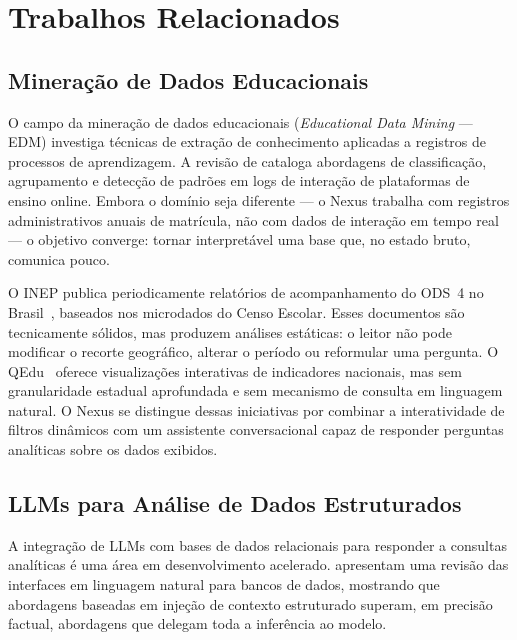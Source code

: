 \documentclass[preprint,10pt,5p]{elsarticle}
\begin{document}
\section{Trabalhos Relacionados}
\label{works}

\subsection{Mineração de Dados Educacionais}

O campo da mineração de dados educacionais (\textit{Educational Data Mining} — EDM)
investiga técnicas de extração de conhecimento aplicadas a registros de processos de
aprendizagem. A revisão de \citet{romero2010} cataloga abordagens de classificação,
agrupamento e detecção de padrões em logs de interação de plataformas de ensino online.
Embora o domínio seja diferente — o Nexus trabalha com registros administrativos anuais de
matrícula, não com dados de interação em tempo real — o objetivo converge: tornar
interpretável uma base que, no estado bruto, comunica pouco.

O INEP publica periodicamente relatórios de acompanhamento do ODS~4 no
Brasil~\cite{inep2022}, baseados nos microdados do Censo Escolar. Esses documentos são
tecnicamente sólidos, mas produzem análises estáticas: o leitor não pode modificar o recorte
geográfico, alterar o período ou reformular uma pergunta. O QEdu~\cite{qedu2023} oferece
visualizações interativas de indicadores nacionais, mas sem granularidade estadual
aprofundada e sem mecanismo de consulta em linguagem natural. O Nexus se distingue dessas
iniciativas por combinar a interatividade de filtros dinâmicos com um assistente
conversacional capaz de responder perguntas analíticas sobre os dados exibidos.

\subsection{LLMs para Análise de Dados Estruturados}

A integração de LLMs com bases de dados relacionais para responder a consultas analíticas
é uma área em desenvolvimento acelerado. \citet{liu2023} apresentam uma revisão das
interfaces em linguagem natural para bancos de dados, mostrando que abordagens baseadas em
injeção de contexto estruturado superam, em precisão factual, abordagens que delegam toda
a inferência ao modelo.
\end{document}
